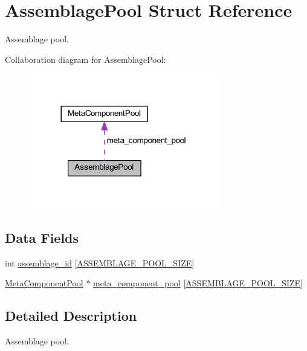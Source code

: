\hypertarget{struct_assemblage_pool}{}\section{Assemblage\+Pool Struct Reference}
\label{struct_assemblage_pool}


Assemblage pool.  




Collaboration diagram for Assemblage\+Pool\+:\nopagebreak
\begin{figure}[H]
\begin{center}
\leavevmode
\includegraphics[width=236pt]{struct_assemblage_pool__coll__graph}
\end{center}
\end{figure}
\subsection*{Data Fields}
\begin{DoxyCompactItemize}
\item 
int \mbox{\hyperlink{struct_assemblage_pool_ae15fe47459f6c895149f5153965c7570}{assemblage\+\_\+id}} \mbox{[}\mbox{\hyperlink{assemblage_8c_a7278dc587e6d944803677e7662c25147}{A\+S\+S\+E\+M\+B\+L\+A\+G\+E\+\_\+\+P\+O\+O\+L\+\_\+\+S\+I\+ZE}}\mbox{]}
\item 
\mbox{\hyperlink{struct_meta_component_pool}{Meta\+Component\+Pool}} $\ast$ \mbox{\hyperlink{struct_assemblage_pool_a84508fb56f488124e510895704581e33}{meta\+\_\+component\+\_\+pool}} \mbox{[}\mbox{\hyperlink{assemblage_8c_a7278dc587e6d944803677e7662c25147}{A\+S\+S\+E\+M\+B\+L\+A\+G\+E\+\_\+\+P\+O\+O\+L\+\_\+\+S\+I\+ZE}}\mbox{]}
\end{DoxyCompactItemize}


\subsection{Detailed Description}
Assemblage pool. 

